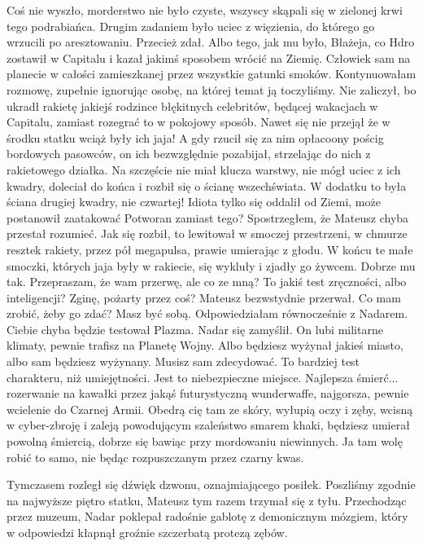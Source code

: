 \begin{dialogue}
Coś nie wyszło, morderstwo nie było czyste, wszyscy skąpali się w zielonej krwi tego podrabiańca.
Drugim zadaniem było uciec z więzienia, do którego go wrzucili po aresztowaniu.
\ds{} Przecież zdał.
\ds{} Albo tego, jak mu było, Błażeja, co Hdro zostawił w Capitalu i kazał jakimś sposobem wrócić na Ziemię.
Człowiek sam na planecie w całości zamieszkanej przez wszystkie gatunki smoków.
\dm{} Kontynuowałam rozmowę, zupełnie ignorując osobę, na której temat ją toczyliśmy.
\ds{} Nie zaliczył, bo ukradł rakietę jakiejś rodzince błękitnych celebritów, będącej wakacjach w Capitalu, zamiast rozegrać to w pokojowy sposób. 
Nawet się nie przejął że w środku statku wciąż były ich jaja!
A gdy rzucił się za nim opłacoony pościg bordowych pasowców, on ich bezwzględnie pozabijał, strzelając do nich z rakietowego działka.
Na szczęście nie miał klucza warstwy, nie mógł uciec z ich kwadry, doleciał do końca i rozbił się o ścianę wszechświata. 
W dodatku to była ściana drugiej kwadry, nie czwartej! 
Idiota tylko się oddalił od Ziemi, może postanowił zaatakować Potworan zamiast tego?
\dm{} Spostrzegłem, że Mateusz chyba przestał rozumieć. \dm{}
Jak się rozbił, to lewitował w smoczej przestrzeni, w chmurze resztek rakiety, przez pół megapulsa, prawie umierając z głodu.
W końcu te małe smoczki, których jaja były w rakiecie, się wykluły i zjadły go żywcem.
Dobrze mu tak.
\ds{} Przepraszam, że wam przerwę, ale co ze mną? To jakiś test zręczności, albo inteligencji? 
Zginę, pożarty przez coś? \dm{} Mateusz bezwstydnie przerwał. \dm{} Co mam zrobić, żeby go zdać?
\ds{} Masz być sobą. \dm{} Odpowiedziałam równocześnie z Nadarem.
\ds{} Ciebie chyba będzie testował Plazma. \dm{} Nadar się zamyślił. \dm{} On lubi militarne klimaty, pewnie trafisz na Planetę Wojny.
Albo będziesz wyżynał jakieś miasto, albo sam będziesz wyżynany. Musisz sam zdecydować.
To bardziej test charakteru, niż umiejętności. Jest to niebezpieczne miejsce.
Najlepsza śmierć... rozerwanie na kawałki przez jakąś futurystyczną wunderwaffe, najgorsza, pewnie wcielenie do Czarnej Armii.
Obedrą cię tam ze skóry, wyłupią oczy i zęby, wcisną w cyber-zbroję i zaleją powodującym szaleństwo smarem khaki, 
będziesz umierał powolną śmiercią, dobrze się bawiąc przy mordowaniu niewinnych. 
Ja tam wolę robić to samo, nie będąc rozpuszczanym przez czarny kwas.
\end{dialogue}

Tymczasem rozległ się dźwięk dzwonu, oznajmiającego posiłek.
Poszliśmy zgodnie na najwyższe piętro statku, Mateusz tym razem trzymał się z tyłu.
Przechodząc przez muzeum, Nadar poklepał radośnie gablotę z demonicznym mózgiem, który w odpowiedzi kłapnął groźnie szczerbatą protezą zębów.

